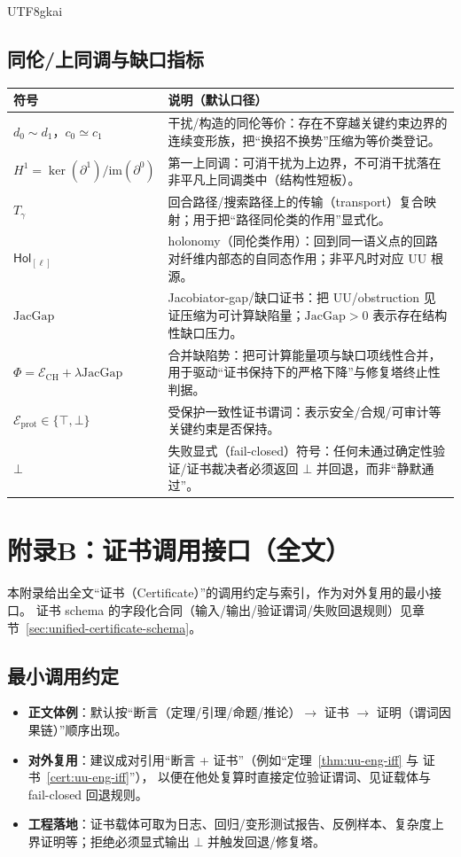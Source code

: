 \documentclass[12pt]{article}
\newcommand{\JacGap}{\ensuremath{\mathrm{JacGap}}} %
\begin{document}
\begin{CJK*}{UTF8}{gkai}
\subsection{同伦/上同调与缺口指标}
\begin{longtable}{>{\raggedright\arraybackslash}p{} >{\raggedright\arraybackslash}p{}}
\hline
\textbf{符号} & \textbf{说明（默认口径）} \\\hline
$d_0\sim d_1$，$c_0\simeq c_1$
& 干扰/构造的同伦等价：存在不穿越关键约束边界的连续变形族，把“换招不换势”压缩为等价类登记。\\
$H^1=\ker(\partial^1)/\mathrm{im}(\partial^0)$
& 第一上同调：可消干扰为上边界，不可消干扰落在非平凡上同调类中（结构性短板）。\\
$T_{\gamma}$
& 回合路径/搜索路径上的传输（transport）复合映射；用于把“路径同伦类的作用”显式化。\\
$\mathsf{Hol}_{[\ell]}$
& holonomy（同伦类作用）：回到同一语义点的回路对纤维内部态的自同态作用；非平凡时对应 UU 根源。\\
$\JacGap$
& Jacobiator-gap/缺口证书：把 UU/obstruction 见证压缩为可计算缺陷量；$\JacGap>0$ 表示存在结构性缺口压力。\\
$\Phi=\mathcal{E}_{\mathrm{CH}}+\lambda\JacGap$
& 合并缺陷势：把可计算能量项与缺口项线性合并，用于驱动“证书保持下的严格下降”与修复塔终止性判据。\\
$\mathcal{E}_{\mathrm{prot}}\in\{\top,\bot\}$
& 受保护一致性证书谓词：表示安全/合规/可审计等关键约束是否保持。\\
$\bot$
& 失败显式（fail-closed）符号：任何未通过确定性验证/证书裁决者必须返回 $\bot$ 并回退，而非“静默通过”。\\
\hline
\end{longtable}

\section{附录B：证书调用接口（全文）}
本附录给出全文“证书（Certificate）”的调用约定与索引，作为对外复用的最小接口。
证书 schema 的字段化合同（输入/输出/验证谓词/失败回退规则）见章节~\ref{sec:unified-certificate-schema}。

\subsection{最小调用约定}
\begin{itemize}
  \item \textbf{正文体例}：默认按“断言（定理/引理/命题/推论）$\to$ 证书 $\to$ 证明（谓词因果链）”顺序出现。
  \item \textbf{对外复用}：建议成对引用“断言 + 证书”（例如“定理~\ref{thm:uu-eng-iff} 与 证书~\ref{cert:uu-eng-iff}”），
  以便在他处复算时直接定位验证谓词、见证载体与 fail-closed 回退规则。
  \item \textbf{工程落地}：证书载体可取为日志、回归/变形测试报告、反例样本、复杂度上界证明等；拒绝必须显式输出 $\bot$ 并触发回退/修复塔。
\end{itemize}


\end{CJK*}
\end{document}
